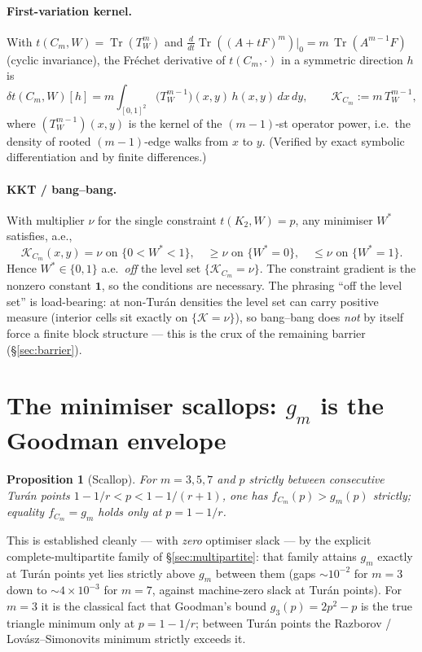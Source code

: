 \documentclass[11pt]{article}
\newtheorem{proposition}[theorem]{Proposition}
\theoremstyle{remark}
\newcommand{\one}{\mathbf 1}
\newcommand{\Tr}{\operatorname{Tr}}
\begin{document}
\paragraph{First-variation kernel.}
With $t(C_m,W)=\Tr(T_W^m)$ and $\tfrac{d}{dt}\Tr((A+tF)^m)|_0=m\,\Tr(A^{m-1}F)$ (cyclic invariance), the Fr\'echet derivative of $t(C_m,\cdot)$ in a symmetric direction $h$ is
\begin{equation}\label{eq:firstvar}
        \delta t(C_m,W)[h]=m\!\int_{[0,1]^2}\!\bigl(T_W^{m-1}\bigr)(x,y)\,h(x,y)\,dx\,dy,
        \qquad \mathcal K_{C_m}:=m\,T_W^{m-1},
\end{equation}
where $(T_W^{m-1})(x,y)$ is the kernel of the $(m-1)$-st operator power, i.e.\ the density of rooted $(m-1)$-edge walks from $x$ to $y$.  (Verified by exact symbolic differentiation and by finite differences.)

\paragraph{KKT / bang--bang.}
With multiplier $\nu$ for the single constraint $t(K_2,W)=p$, any minimiser $W^*$ satisfies, a.e.,
\[
        \mathcal K_{C_m}(x,y)=\nu \text{ on } \{0<W^*<1\},\quad
        \ge\nu \text{ on } \{W^*=0\},\quad
        \le\nu \text{ on } \{W^*=1\}.
\]
Hence $W^*\in\{0,1\}$ a.e.\ \emph{off} the level set $\{\mathcal K_{C_m}=\nu\}$.  The constraint gradient is the nonzero constant $\one$, so the conditions are necessary.  The phrasing ``off the level set'' is load-bearing: at non-Tur\'an densities the level set can carry positive measure (interior cells sit exactly on $\{\mathcal K=\nu\}$), so bang--bang does \emph{not} by itself force a finite block structure --- this is the crux of the remaining barrier (\S\ref{sec:barrier}).

\section{The minimiser scallops: $g_m$ is the Goodman envelope}\label{sec:scallop}

\begin{proposition}[Scallop]\label{prop:scallop}
For $m=3,5,7$ and $p$ strictly between consecutive Tur\'an points $1-1/r<p<1-1/(r+1)$, one has $f_{C_m}(p)>g_m(p)$ strictly; equality $f_{C_m}=g_m$ holds only at $p=1-1/r$.
\end{proposition}

This is established cleanly --- with \emph{zero} optimiser slack --- by the explicit complete-multipartite family of \S\ref{sec:multipartite}: that family attains $g_m$ exactly at Tur\'an points yet lies strictly above $g_m$ between them (gaps $\sim10^{-2}$ for $m=3$ down to $\sim4\times10^{-3}$ for $m=7$, against machine-zero slack at Tur\'an points).  For $m=3$ it is the classical fact that Goodman's bound $g_3(p)=2p^2-p$ is the true triangle minimum only at $p=1-1/r$; between Tur\'an points the Razborov / Lov\'asz--Simonovits minimum strictly exceeds it.
\end{document}
